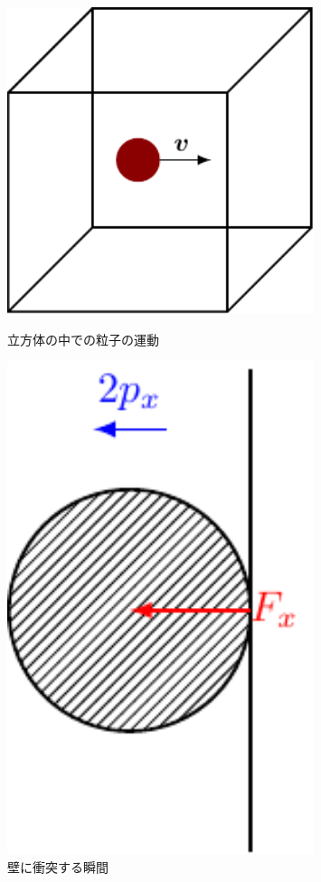 \documentclass[unicode,a4paper,10pt]{ltjsarticle}
\begin{document}
\begin{enumerate}
  \begin{figure}[ht]
    \centering
    \begin{minipage}{0.4\textwidth}
      \centering
      \includegraphics[width=0.8\textwidth]{fig/fig01.pdf}
      \caption{立方体の中での粒子の運動}      
    \end{minipage}
    \begin{minipage}{0.3\textwidth}
      \centering
      \includegraphics[width=0.8\textwidth]{fig/fig02.pdf}
      \caption{壁に衝突する瞬間}      
    \end{minipage}
  \end{figure}


\end{enumerate}
\end{document}
